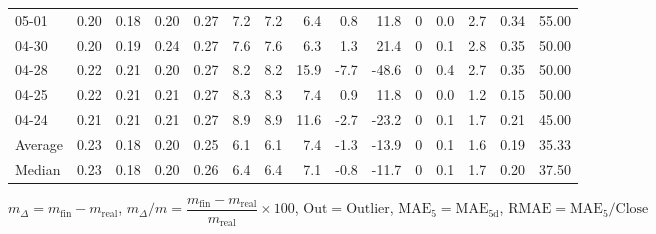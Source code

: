 \begin{threeparttable}
{\begin{tabular}{lrrrrrrrrrrrrrr}
  05-01 &          0.20 &          0.18 &          0.20 &        0.27 &                 7.2 &                7.2 &                 6.4 &        0.8 &         11.8 &              0 &                 0.0 &              2.7 &            0.34 &                  55.00 \\
  04-30 &          0.20 &          0.19 &          0.24 &        0.27 &                 7.6 &                7.6 &                 6.3 &        1.3 &         21.4 &              0 &                 0.1 &              2.8 &            0.35 &                  50.00 \\
  04-28 &          0.22 &          0.21 &          0.20 &        0.27 &                 8.2 &                8.2 &                15.9 &       -7.7 &        -48.6 &              0 &                 0.4 &              2.7 &            0.35 &                  50.00 \\
  04-25 &          0.22 &          0.21 &          0.21 &        0.27 &                 8.3 &                8.3 &                 7.4 &        0.9 &         11.8 &              0 &                 0.0 &              1.2 &            0.15 &                  50.00 \\
  04-24 &          0.21 &          0.21 &          0.21 &        0.27 &                 8.9 &                8.9 &                11.6 &       -2.7 &        -23.2 &              0 &                 0.1 &              1.7 &            0.21 &                  45.00 \\
Average &          0.23 &          0.18 &          0.20 &        0.25 &                 6.1 &                6.1 &                 7.4 &       -1.3 &        -13.9 &              0 &                 0.1 &              1.6 &            0.19 &                  35.33 \\
 Median &          0.23 &          0.18 &          0.20 &        0.26 &                 6.4 &                6.4 &                 7.1 &       -0.8 &        -11.7 &              0 &                 0.1 &              1.7 &            0.20 &                  37.50 \\
\bottomrule
\end{tabular}
}
\begin{tablenotes}\footnotesize
\item $m_\Delta=m_{\text{fin}}-m_{\text{real}}$,
$m_\Delta/m=\dfrac{m_{\text{fin}}-m_{\text{real}}}{m_{\text{real}}}\times100$,
$\mathrm{Out}=\text{Outlier}$,
$\mathrm{MAE}_5=\mathrm{MAE}_{5\text{d}}$,
$\mathrm{RMAE}=\mathrm{MAE}_5/\text{Close}$
\end{tablenotes}
\end{threeparttable}
\endgroup

